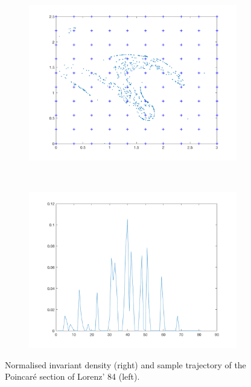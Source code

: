 \begin{figure}[H]
	\centering
	\begin{subfigure}[b]{0.4\textwidth}
		\includegraphics[width=\textwidth]{invariantl84.png}
		\label{henon0}
	\end{subfigure}
	~ %
	\begin{subfigure}[b]{0.4\textwidth}
		\includegraphics[width=\textwidth]{poincarel84map.png}
		\label{fig:tiger}
	\end{subfigure}
	\caption{Normalised invariant density (right) and sample trajectory of the Poincar\'{e} section of Lorenz' 84 (left).}
\end{figure}

